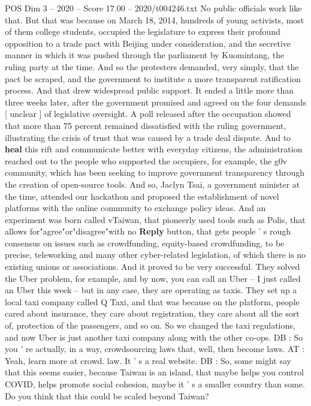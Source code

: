 \begin{textsample}{POS Dim 3 – 2020 – Score 17.00 – 2020/t004246.txt}
No public officials work like that.
But that was because on March 18, 2014, hundreds of young activists, most of them college students, occupied the legislature to express their profound opposition to a trade pact with Beijing under consideration, and the secretive manner in which it was pushed through the parliament by Kuomintang, the ruling party at the time.
And so the protesters demanded, very simply, that the pact be scraped, and the government to institute a more transparent ratification process.
And that drew widespread public support.
It ended a little more than three weeks later, after the government promised and agreed on the four demands [ unclear ] of legislative oversight.
A poll released after the occupation showed that more than 75 percent remained dissatisfied with the ruling government, illustrating the crisis of trust that was caused by a trade deal dispute.
And to \textbf{heal} this rift and communicate better with everyday citizens, the administration reached out to the people who supported the occupiers, for example, the g0v community, which has been seeking to improve government transparency through the creation of open-source tools.
And so, Jaclyn Tsai, a government minister at the time, attended our hackathon and proposed the establishment of novel platforms with the online community to exchange policy ideas.
And an experiment was born called vTaiwan, that pioneerly used tools such as Polis, that allows for"agree"or"disagree"with no \textbf{Reply} button, that gets people ' s rough consensus on issues such as crowdfunding, equity-based crowdfunding, to be precise, teleworking and many other cyber-related legislation, of which there is no existing unions or associations.
And it proved to be very successful.
They solved the Uber problem, for example, and by now, you can call an Uber -- I just called an Uber this week -- but in any case, they are operating as taxis.
They set up a local taxi company called Q Taxi, and that was because on the platform, people cared about insurance, they care about registration, they care about all the sort of, protection of the passengers, and so on.
So we changed the taxi regulations, and now Uber is just another taxi company along with the other co-ops.
DB : So you ' re actually, in a way, crowdsourcing laws that, well, then become laws.
AT : Yeah, learn more at crowd. law.
It ' s a real website.
DB : So, some might say that this seems easier, because Taiwan is an island, that maybe helps you control COVID, helps promote social cohesion, maybe it ' s a smaller country than some.
Do you think that this could be scaled beyond Taiwan?

\end{textsample}
